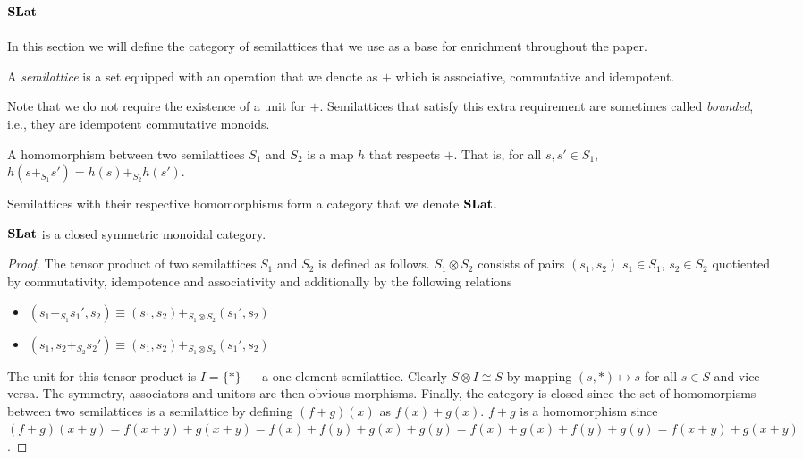 \subsection{$\mathbf{SLat}$}
\label{sec:appendix:slat}

In this section we will define the category of semilattices that we use as a base for enrichment throughout the paper.

\begin{definition}[Semilattice]
    A \textit{semilattice} is a set equipped with an operation that we denote as $+$ which is associative, commutative and idempotent.
  \end{definition}
  
  Note that we do not require the existence of a unit for $+$. 
  Semilattices that satisfy this extra requirement are sometimes called \textit{bounded}, i.e., they are idempotent commutative monoids.
  
  \begin{definition}
  
  A homomorphism between two semilattices $S_{1}$ and $S_{2}$ is a map $h$ that respects $+$.
  That is, for all $s,s' \in S_{1}$, $h(s +_{S_{1}} s') = h(s) +_{S_{2}} h(s')$.
  \end{definition}
  
  \begin{definition}
    
  Semilattices with their respective homomorphisms form a category that we denote $\mathbf{SLat}$.
  \end{definition}
  
  \begin{proposition}
    $\mathbf{SLat}$ is a closed symmetric monoidal category.
  \end{proposition}
  \begin{proof}
    The tensor product of two semilattices $S_{1}$ and $S_{2}$ is defined as follows.
    $S_{1} \otimes S_{2}$ consists of pairs $(s_1,s_2)$ $s_{1} \in S_{1}$, $s_{2} \in S_{2}$ quotiented by commutativity, idempotence and associativity and additionally by the following relations
    \begin{itemize}
      \item $(s_{1} +_{S_{1}} s_{1}',s_{2}) \equiv (s_{1},s_{2}) +_{S_{1} \otimes S_{2}} (s_{1}',s_{2})$
      \item $(s_{1}, s_{2} +_{S_{2}} s_{2}') \equiv (s_{1},s_{2}) +_{S_{1} \otimes S_{2}} (s_{1}',s_{2})$
    \end{itemize}
  
    The unit for this tensor product is $I = \{*\}$ --- a one-element semilattice.
    Clearly $S \otimes I \cong S$ by mapping $(s,*) \mapsto s$ for all $s \in S$ and vice versa.
    The symmetry, associators and unitors are then obvious morphisms.
    Finally, the category is closed since the set of homomorpisms between two semilattices is a semilattice by defining $(f + g)(x)$ as $f(x) + g(x)$.
    $f + g$ is a homomorphism since $(f + g)(x+y) = f(x+y) + g(x+y) = f(x) + f(y) + g(x) + g(y) = f(x) + g(x) + f(y) + g(y) = f(x+y) + g(x+y)$.
  \end{proof}
  
